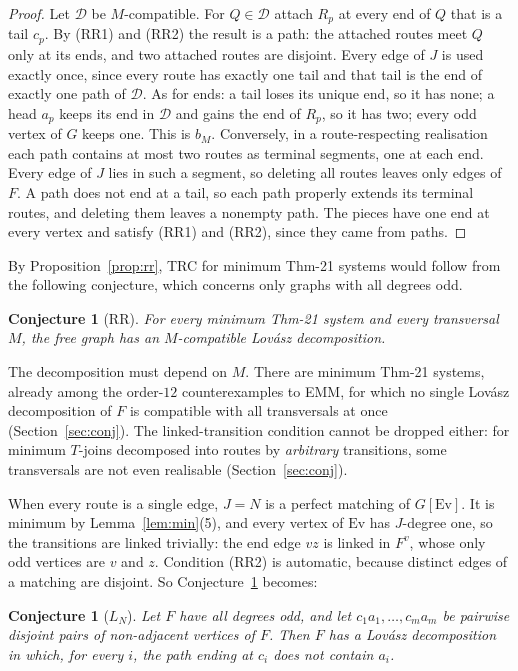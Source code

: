 \documentclass[11pt]{amsart}
\newtheorem{conjecture}[theorem]{Conjecture}
\theoremstyle{definition}
\newcommand{\Ev}{\mathrm{Ev}}
\newcommand{\cD}{\mathcal D}
\begin{document}
\begin{proof}
Let $\cD$ be $M$-compatible. For $Q\in\cD$ attach $R_p$ at every end of $Q$ that is a tail $c_p$. By
(RR1) and (RR2) the result is a path: the attached routes meet $Q$ only at its ends, and two attached
routes are disjoint. Every edge of $J$ is used exactly once, since every route has exactly one tail and
that tail is the end of exactly one path of $\cD$. As for ends: a tail loses its unique end, so it has
none; a head $a_p$ keeps its end in $\cD$ and gains the end of $R_p$, so it has two; every odd vertex of
$G$ keeps one. This is $b_M$. Conversely, in a route-respecting realisation each path contains at most two
routes as terminal segments, one at each end. Every edge of $J$ lies in such a segment, so deleting all
routes leaves only edges of $F$. A path does not end at a tail, so each path properly extends its
terminal routes, and deleting them leaves a nonempty path. The pieces have one end at every vertex and
satisfy (RR1) and (RR2), since they came from paths.
\end{proof}

By Proposition~\ref{prop:rr}, TRC for minimum Thm-21 systems would follow from the following
conjecture, which concerns only graphs with all degrees odd.

\begin{conjecture}[RR]\label{conj:rr}
For every minimum Thm-21 system and every transversal $M$, the free graph has an $M$-compatible
Lov\'asz decomposition.
\end{conjecture}

The decomposition must depend on $M$. There are minimum Thm-21 systems, already among the order-$12$
counterexamples to EMM, for which no single Lov\'asz decomposition of $F$ is compatible with all
transversals at once (Section~\ref{sec:conj}). The linked-transition condition cannot be dropped either:
for minimum $T$-joins decomposed into routes by \emph{arbitrary} transitions, some transversals are not
even realisable (Section~\ref{sec:conj}).

When every route is a single edge, $J=N$ is a perfect matching of $G[\Ev]$. It is minimum by
Lemma~\ref{lem:min}(5), and every vertex of $\Ev$ has $J$-degree one, so the transitions are linked
trivially: the end edge $vz$ is linked in $F^v$, whose only odd vertices are $v$ and $z$. Condition (RR2)
is automatic, because distinct edges of a matching are disjoint. So Conjecture~\ref{conj:rr} becomes:

\begin{conjecture}[$L_N$]\label{conj:LN}
Let $F$ have all degrees odd, and let $c_1a_1,\dots,c_ma_m$ be pairwise disjoint pairs of non-adjacent
vertices of $F$. Then $F$ has a Lov\'asz decomposition in which, for every $i$, the path ending at $c_i$
does not contain $a_i$.
\end{conjecture}
\end{document}
